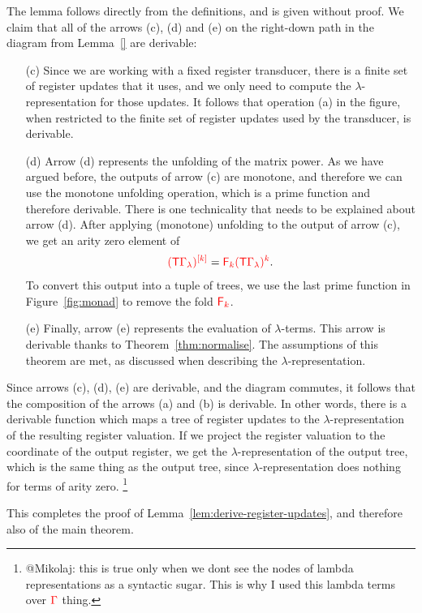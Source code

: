 The lemma follows  directly from the definitions, and is given without proof.  
We claim that all of the arrows (c), (d) and (e) on the  right-down path  in the diagram from Lemma~\ref{}  are derivable:
\begin{itemize}
    \item[(c)] Since we are working with a fixed register transducer, there is a finite set of register updates that it uses, and we only need to compute the $\lambda$-representation for those updates. It follows that operation (a) in the figure, when restricted to the finite set of register updates used by the transducer, is derivable.
    \item[(d)] Arrow (d) represents the unfolding of the matrix power. As we have argued before, the outputs of arrow (c) are monotone, and therefore we can use the monotone unfolding operation, which is a  prime function and therefore derivable. There is one technicality that needs to be explained about arrow (d). After applying (monotone) unfolding to the output of arrow (c), we get an  arity zero element of 
    \begin{align*}
        \ranked{
            \mati k {(\tmonad \rGamma_\lambda)}} = \reduce  k {\powersmall{(\tmonad \rGamma_\lambda)}{k}}.
    \end{align*}
    To convert this output into a tuple of trees, we use the last prime function in Figure~\ref{fig:monad} to remove the fold $\reduce k$.
    \item[(e)] Finally, arrow (e) represents the evaluation of $\lambda$-terms. This arrow is derivable thanks to Theorem~\ref{thm:normalise}. The assumptions of this theorem are met, as discussed when describing the $\lambda$-representation.
\end{itemize}
Since arrows (c), (d), (e) are derivable, and the diagram commutes, it follows that  the composition of the arrows (a) and (b) is derivable. In other words, there is a derivable function which maps a tree of register updates to the $\lambda$-representation of the resulting register valuation. If we project the register valuation to the coordinate of the output register, we get the $\lambda$-representation of the output tree, which is the same thing as the output tree, since $\lambda$-representation does nothing for terms of arity zero. \footnote{@Mikolaj: this is true only when we dont see the nodes of lambda representations as a syntactic sugar. This is why I used this lambda terms over $\rGamma$ thing. }

This completes the proof of Lemma~\ref{lem:derive-register-updates}, and therefore also of the main theorem. 




